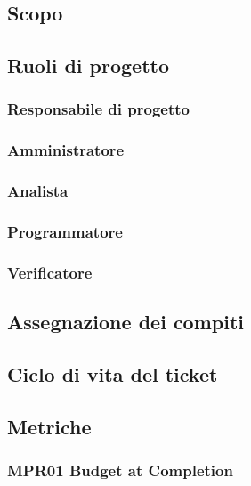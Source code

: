 \subsection{Scopo}\label{4.2.1}

\subsection{Ruoli di progetto}\label{4.2.2}

\subsubsection{Responsabile di progetto}\label{4.2.2.1}

\subsubsection{Amministratore}\label{4.2.2.2}

\subsubsection{Analista}\label{4.2.2.3}

\subsubsection{Programmatore}\label{4.2.2.4}

\subsubsection{Verificatore}\label{4.2.2.5}

\subsection{Assegnazione dei compiti}\label{4.2.3}

\subsection{Ciclo di vita del ticket}\label{4.2.4}

\subsection{Metriche}\label{4.2.5}

\subsubsection{MPR01 Budget at Completion}\label{4.2.5.1}

